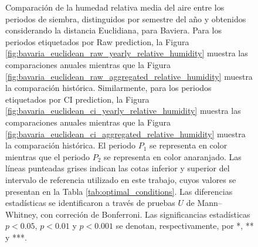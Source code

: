 \begin{figure}[htbp]
	\caption{
		Comparación de la humedad relativa media del aire entre los periodos de siembra, distinguidos por semestre del año y obtenidos considerando la distancia Euclidiana, para Baviera. Para los periodos etiquetados por Raw prediction, la Figura \ref{fig:bavaria_euclidean_raw_yearly_relative_humidity} muestra las comparaciones anuales mientras que la Figura \ref{fig:bavaria_euclidean_raw_aggregated_relative_humidity} muestra la comparación histórica. Similarmente, para los periodos etiquetados por CI prediction, la Figura \ref{fig:bavaria_euclidean_ci_yearly_relative_humidity} muestra las comparaciones anuales mientras que la Figura \ref{fig:bavaria_euclidean_ci_aggregated_relative_humidity} muestra la comparación histórica. El periodo $P_1$ se representa en color mientras que el periodo $P_2$ se representa en color anaranjado. Las líneas punteadas grises indican las cotas inferior y superior del intervalo de referencia utilizado en este trabajo, cuyos valores se presentan en la Tabla \ref{tab:optimal_conditions}. Las diferencias estadísticas se identificaron a través de pruebas $U$ de Mann--Whitney, con correción de Bonferroni. Las significancias estadísticas $p<0.05$, $p<0.01$ y $p<0.001$ se denotan, respectivamente, por *, ** y ***.
	}
	\label{fig:bavaria_euclidean_relative_humidity}
	
	
\end{figure}



